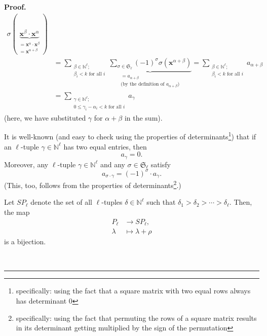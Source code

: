 \documentclass[numbers=enddot,12pt,final,onecolumn,notitlepage]{scrartcl}%
\theoremstyle{definition}
\newenvironment{proof}[1][Proof]{\noindent\textbf{#1.} }{\ \rule{0.5em}{0.5em}}
\let\sumnonlimits\sum
\renewcommand{\sum}{\sumnonlimits\limits}
\newenvironment{vershort}{}{}
\begin{document}
\begin{vershort}
\begin{proof}
\begin{align}
\sigma\left(  \underbrace{\mathbf{x}^{\beta}\cdot\mathbf{x}^{\alpha}%
}_{\substack{=\mathbf{x}^{\alpha}\cdot\mathbf{x}^{\beta}\\=\mathbf{x}%
^{\alpha+\beta}}}\right) \nonumber\\
&  =\sum_{\substack{\beta\in\mathbb{N}^{\ell};\\\beta_{i}<k\text{ for all }%
i}}\underbrace{\sum_{\sigma\in\mathfrak{S}_{\ell}}\left(  -1\right)  ^{\sigma
}\sigma\left(  \mathbf{x}^{\alpha+\beta}\right)  }_{\substack{=a_{\alpha
+\beta}\\\text{(by the definition of }a_{\alpha+\beta}\text{)}}}=\sum
_{\substack{\beta\in\mathbb{N}^{\ell};\\\beta_{i}<k\text{ for all }%
i}}a_{\alpha+\beta}\nonumber\\
&  =\sum_{\substack{\gamma\in\mathbb{N}^{\ell};\\0\leq\gamma_{i}-\alpha
_{i}<k\text{ for all }i}}a_{\gamma} \label{pf.thm.G.pieri.short.prod1}%
\end{align}
(here, we have substituted $\gamma$ for $\alpha+\beta$ in the sum).

It is well-known (and easy to check using the properties of
determinants\footnote{specifically: using the fact that a square matrix with
two equal rows always has determinant $0$}) that if an $\ell$-tuple $\gamma
\in\mathbb{N}^{\ell}$ has two equal entries, then%
\begin{equation}
a_{\gamma}=0. \label{pf.thm.G.pieri.short.agam=0}%
\end{equation}
Moreover, any $\ell$-tuple $\gamma\in\mathbb{N}^{\ell}$ and any $\sigma
\in\mathfrak{S}_{\ell}$ satisfy%
\begin{equation}
a_{\sigma\cdot\gamma}=\left(  -1\right)  ^{\sigma}\cdot a_{\gamma}.
\label{pf.thm.G.pieri.short.asiggam=}%
\end{equation}
(This, too, follows from the properties of determinants\footnote{specifically:
using the fact that permuting the rows of a square matrix results in its
determinant getting multiplied by the sign of the permutation}.)

Let $SP_{\ell}$ denote the set of all $\ell$-tuples $\delta\in\mathbb{N}%
^{\ell}$ such that $\delta_{1}>\delta_{2}>\cdots>\delta_{\ell}$. Then, the map%
\begin{align}
P_{\ell}  &  \rightarrow SP_{\ell},\nonumber\\
\lambda &  \mapsto\lambda+\rho\label{pf.thm.G.pieri.short.PSPbij}%
\end{align}
is a bijection.


\end{proof}
\end{vershort}
\end{document}
